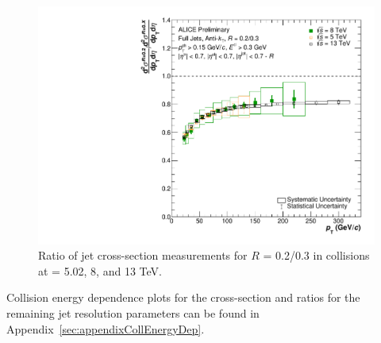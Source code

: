 \begin{figure}[hbt!]
    \centering
    \includegraphics[width=\textwidth]{figures/EnergyComparisons/RatioComparison_R03.pdf}
    \caption{Ratio of jet cross-section measurements for $R$ = 0.2/0.3 in \pp collisions at \s = 5.02, 8, and 13 TeV.}
    \label{fig:ratioCompareR03}
\end{figure}

Collision energy dependence plots for the cross-section and ratios for the remaining jet resolution parameters can be found in Appendix~\ref{sec:appendixCollEnergyDep}.